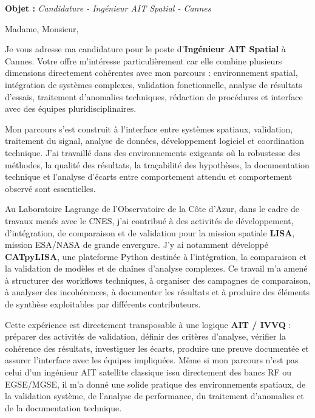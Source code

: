 \documentclass[11pt,a4paper]{altacv}
\begin{document}
\makecvheader
\vspace{-0.6cm}

\vspace{-0.4cm}

{\color{accent}\textbf{Objet :}} \textit{Candidature - Ingénieur AIT Spatial - Cannes}

{\color{body}

Madame, Monsieur,

Je vous adresse ma candidature pour le poste d'\textbf{Ingénieur AIT Spatial} à Cannes. Votre offre m'intéresse particulièrement car elle combine plusieurs dimensions directement cohérentes avec mon parcours : environnement spatial, intégration de systèmes complexes, validation fonctionnelle, analyse de résultats d'essais, traitement d'anomalies techniques, rédaction de procédures et interface avec des équipes pluridisciplinaires.

Mon parcours s'est construit à l'interface entre systèmes spatiaux, validation, traitement du signal, analyse de données, développement logiciel et coordination technique. J'ai travaillé dans des environnements exigeants où la robustesse des méthodes, la qualité des résultats, la traçabilité des hypothèses, la documentation technique et l'analyse d'écarts entre comportement attendu et comportement observé sont essentielles.

Au Laboratoire Lagrange de l'Observatoire de la Côte d'Azur, dans le cadre de travaux menés avec le CNES, j'ai contribué à des activités de développement, d'intégration, de comparaison et de validation pour la mission spatiale \textbf{LISA}, mission ESA/NASA de grande envergure. J'y ai notamment développé \textbf{CATpyLISA}, une plateforme Python destinée à l'intégration, la comparaison et la validation de modèles et de chaînes d'analyse complexes. Ce travail m'a amené à structurer des workflows techniques, à organiser des campagnes de comparaison, à analyser des incohérences, à documenter les résultats et à produire des éléments de synthèse exploitables par différents contributeurs.

Cette expérience est directement transposable à une logique \textbf{AIT / IVVQ} : préparer des activités de validation, définir des critères d'analyse, vérifier la cohérence des résultats, investiguer les écarts, produire une preuve documentée et assurer l'interface avec les équipes impliquées. Même si mon parcours n'est pas celui d'un ingénieur AIT satellite classique issu directement des bancs RF ou EGSE/MGSE, il m'a donné une solide pratique des environnements spatiaux, de la validation système, de l'analyse de performance, du traitement d'anomalies et de la documentation technique.

}
\end{document}
